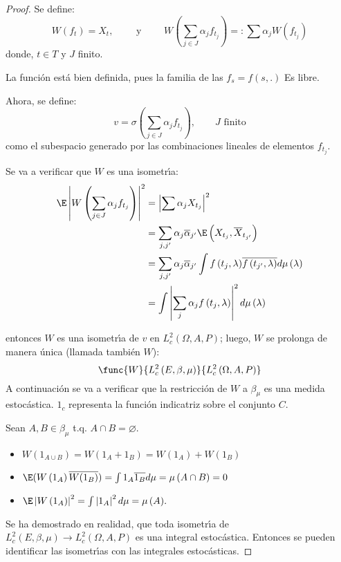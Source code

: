 \begin{proof}
 
Se define:
\[
W\left( f_{t} \right)=X_{t},\qquad \text{ y }\qquad W\left( \sum_{j\in J}{\alpha_{j}f_{t_{j}}} \right)=:\sum {\alpha_{j}W\left( f_{t_{j}} \right)} 
\]
donde, $t\in T$ y $J$ finito. 

La funci\'{o}n est\'{a} bien definida, pues la familia de las $f_{s}=f\left(s,. \right)$ Es libre.

Ahora, se define: 
\[
v=\sigma \left( \sum_{j\in J} {\alpha_{j}f_{t_{j}}} 
\right),\qquad J\text{ finito}
\]
como el subespacio generado por las combinaciones lineales de elementos $f_{t_{j}}$. 

Se va a verificar que $W$ es una isometr\'{\i}a:
\begin{align*}
 \E\left| W\left( \sum_{j\in J} {\alpha_{j}f_{t_{j}}} \right) \right|^{2}
	&= \left| \sum {\alpha_{j}X_{t_{j}}} \right|^{2}\\
	&=\sum_{j,j'} {\alpha_{j}\overline{\alpha }_{j'}} \E\left( X_{t_{j}},\overline{X}_{t_{j'}} \right)\\
	&=\sum_{j,j'} {\alpha_{j}\overline{\alpha }_{j'}} \int {f\left(t_{j},\lambda \right)} \overline{f\left( t_{j'},\lambda \right)}d\mu \left( \lambda \right)\\
	&=\int {\left| \sum_j {\alpha_{j}f\left( t_{j},\lambda \right)} \right|^{2}d\mu \left( \lambda \right)} 
\end{align*}

entonces $W$ es una isometr\'{\i}a de $v$ en $L_{c}^{2}\left(\Omega,A,P \right)$; luego, $W$ se prolonga de manera \'{u}nica (llamada tambi\'{e}n $W$):
\[
\func{W}{L_{c}^{2}\left( E,\beta ,\mu \right)}{L_{c}^{2}\left(\Omega,A,P \right)}
\]
A continuaci\'{o}n se va a verificar que la restricci\'{o}n de $W$ a $\beta_{\mu }$ es una medida estoc\'{a}stica. $1_{c}$ representa la funci\'{o}n indicatriz sobre el conjunto $C$.

Sean $A,B\in \beta_{\mu }$ t.q. $A\cap B=\varnothing$.
\begin{itemize}
\item $W\left( {1_{A\cup B} } \right)=W\left( {1_{A} +1_{B} } \right)=W\left( {1_{A} } \right)+W\left( {1_{B} } \right)$
\item $\E(W\left( {1_{A} } \right)\overline {W(1_{B} )} )=\int {1_{A} \overline {1_{B} } d\mu =\mu \left( {A\cap B} \right)=0} $
\item $\E\left| {W\left( {1_{A} } \right)} \right|^{2}=\int 
{\left| {1_{A} } \right|^{2}d\mu =\mu \left( A \right)} .$
\end{itemize}

Se ha demostrado en realidad, que toda isometr\'{\i}a de $L_{c}^{2}\left( E,\beta ,\mu \right)\to L_{c}^{2}\left( \Omega ,A,P \right)$ es una integral estoc\'{a}stica. Entonces se pueden identificar las isometr\'{\i}as con las integrales estoc\'{a}sticas.
\end{proof}

